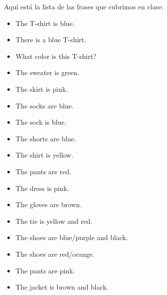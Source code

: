 Aqu\'i est\'a la lista de las frases que cubrimos en clase:
\begin{itemize}
	\item The T-shirt is blue. \arr {}
	\item There is a blue T-shirt. \arr {}
	\item What color is this T-shirt? \arr {}
	\item The sweater is green. \arr {}
	\item The skirt is pink. \arr {}
	\item The socks are blue. \arr {}
	\item The sock is blue. \arr {}
	\item The shorts are blue. 
	\item The shirt is yellow. 
	\item The pants are red. \arr {}
	\item The dress is pink. \arr {}
	\item The gloves are brown. \arr {}
	\item The tie is yellow and red. \arr {}
	\item The shoes are blue/purple and black. \arr {}
	\item The shoes are red/orange. \arr {}
	\item The pants are pink. \arr {}
	\item The jacket is brown and black. \arr {}
\end{itemize}
